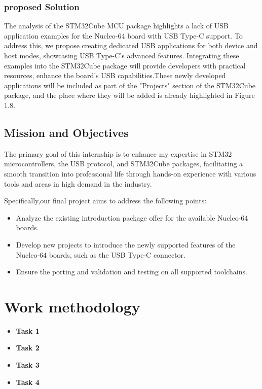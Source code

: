 \subsubsection{proposed Solution}
The analysis of the STM32Cube MCU package highlights a lack of USB application examples for the Nucleo-64 board with USB Type-C support. To address this, we propose creating dedicated USB applications for both device and host modes, showcasing USB Type-C's advanced features. Integrating these examples into the STM32Cube package will provide developers with practical resources, enhance the board's USB capabilities.These newly developed applications will be included as part of the "Projects" section of the STM32Cube package, and the place where they will be added is already highlighted in Figure 1.8.
\subsection{Mission and Objectives}
The primary goal of this internship is to enhance my expertise in STM32 microcontrollers, the USB protocol, and STM32Cube packages, facilitating a smooth transition into professional life through hands-on experience with various tools and areas in high demand in the industry.

Specifically,our final project aims to address the following points:

\begin{itemize}
    \item  Analyze the existing introduction package offer for the available Nucleo-64 boards.
    \item Develop new projects to introduce the newly supported features of the Nucleo-64 boards, such as the USB Type-C connector.
    \item Ensure the porting and validation and testing on all supported toolchains.
\end{itemize}
\section{Work methodology}
\begin{itemize}
\item \textbf{Task 1}
\item \textbf{Task 2}
\item \textbf{Task 3}
\item \textbf{Task 4}

\end{itemize}
